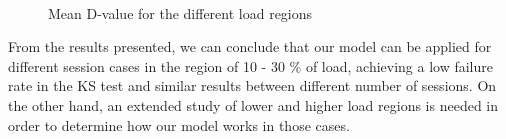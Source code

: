 \begin{figure}[h!]
	\centering
	\\
	\caption{Mean D-value for the different load regions}
	\label{fig:insession_d_regions}
\end{figure}

From the results presented, we can conclude that our model can be applied for different session cases in the region of 10 - 30 \% of load, achieving a low failure rate in the KS test and similar results between different number of sessions. On the other hand, an extended study of lower and higher load regions is needed in order to determine how our model works in those cases.